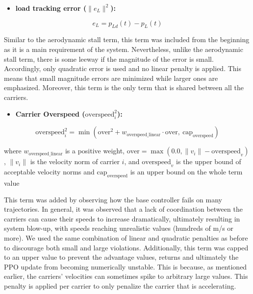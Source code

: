 \begin{itemize}
  \item \textbf{load tracking error ($\|e_L\|^2$):}
\end{itemize}

\begin{equation}
  e_L = p_{Ld}(t) - p_L(t)
  \label{eq:load-tracking-error}
\end{equation}

Similar to the aerodynamic stall term, this term was included from the
beginning as it is a main requirement of the system. Nevertheless,
unlike the aerodynamic stall term, there is some leeway if the magnitude
of the error is small. Accordingly, only quadratic error is used and no
linear penalty is applied. This means that small magnitude errors are
minimized while larger ones are emphasized. Moreover, this term is the
only term that is shared between all the carriers.

\begin{itemize}
  \item \textbf{Carrier Overspeed ($\text{overspeed}_i^2$):}
\end{itemize}

\begin{equation}
  \text{overspeed}_i^2 = \min\left(\text{over}^2 + w_{\text{overspeed\_linear}} \cdot \text{over}, \ \text{cap}_{\text{overspeed}}\right)
  \label{eq:overspeed-term}
\end{equation}

where $w_{\text{overspeed\_linear}}$ is a positive weight, $\text{over}
= \max(0.0, \|v_i\| - \text{overspeed}_v)$, $\|v_i\|$ is the velocity
norm of carrier $i$, and $\text{overspeed}_v$ is the upper bound of
acceptable velocity norms and $\text{cap}_{\text{overspeed}}$ is an
upper bound on the whole term value

This term was added by observing how the base controller fails on many
trajectories. In general, it was observed that a lack of coordination
between the carriers can cause their speeds to increase dramatically,
ultimately resulting in system blow-up, with speeds reaching unrealistic
values (hundreds of m/s or more). We used the same combination of
linear and quadratic penalties as before to discourage both small and
large violations. Additionally, this term was capped to an upper value to
prevent the advantage values, returns and ultimately the PPO update from
becoming numerically unstable. This is because, as mentioned earlier,
the carriers’ velocities can sometimes spike to arbitrary large values.
This penalty is applied per carrier to only penalize the carrier that is
accelerating.

